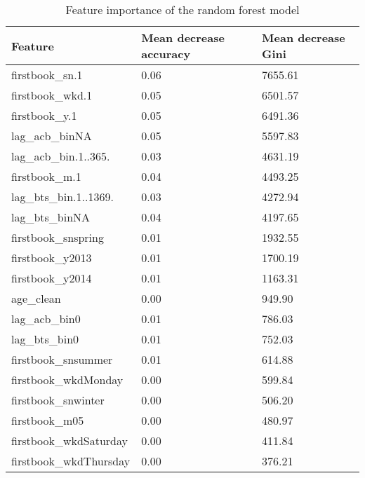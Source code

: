 \documentclass{article}
\begin{document}
\begin{table}[ht]
\centering
\begin{tabular}{| l | l | l |}
  \hline
  \textbf{Feature} & \textbf{Mean decrease accuracy} & \textbf{Mean decrease Gini} \\ 
  \hline
  firstbook\_sn.1 & 0.06 & 7655.61 \\ 
  firstbook\_wkd.1 & 0.05 & 6501.57 \\ 
  firstbook\_y.1 & 0.05 & 6491.36 \\ 
  lag\_acb\_binNA & 0.05 & 5597.83 \\ 
  lag\_acb\_bin.1..365. & 0.03 & 4631.19 \\ 
  firstbook\_m.1 & 0.04 & 4493.25 \\ 
  lag\_bts\_bin.1..1369. & 0.03 & 4272.94 \\ 
  lag\_bts\_binNA & 0.04 & 4197.65 \\ 
  firstbook\_snspring & 0.01 & 1932.55 \\ 
  firstbook\_y2013 & 0.01 & 1700.19 \\ 
  firstbook\_y2014 & 0.01 & 1163.31 \\ 
  age\_clean & 0.00 & 949.90 \\ 
  lag\_acb\_bin0 & 0.01 & 786.03 \\ 
  lag\_bts\_bin0 & 0.01 & 752.03 \\ 
  firstbook\_snsummer & 0.01 & 614.88 \\ 
  firstbook\_wkdMonday & 0.00 & 599.84 \\ 
  firstbook\_snwinter & 0.00 & 506.20 \\ 
  firstbook\_m05 & 0.00 & 480.97 \\ 
  firstbook\_wkdSaturday & 0.00 & 411.84 \\ 
  firstbook\_wkdThursday & 0.00 & 376.21 \\ 
   \hline
\end{tabular}
\caption{Feature importance of the random forest model}
\label{table:feature_imp_rf}
\end{table}
\end{document}
